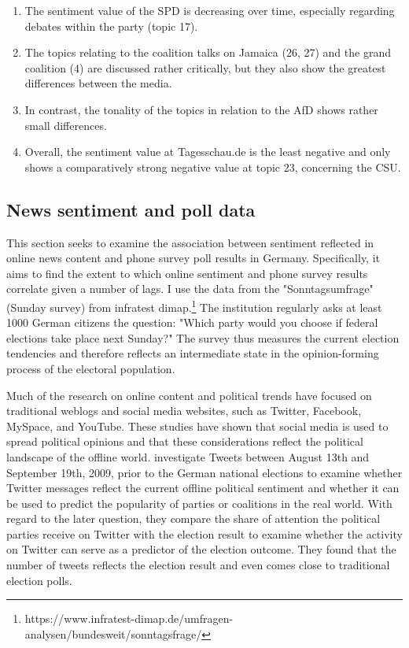\documentclass[12pt,a4paper,notitlepage]{article}
\begin{document}
\begin{enumerate}
	\item The sentiment value of the SPD is decreasing over time, especially regarding debates within the party (topic 17). 
	\item The topics relating to the coalition talks on Jamaica (26, 27) and the grand coalition (4) are discussed rather critically, but they also show the greatest differences between the media. 
	\item In contrast, the tonality of the topics in relation to the AfD shows rather small differences. 
	\item Overall, the sentiment value at Tagesschau.de is the least negative and only shows a comparatively strong negative value at topic 23, concerning the CSU.
\end{enumerate} 

\subsection{News sentiment and poll data}\label{ch_correlation}

This section seeks to examine the association between sentiment reflected in online news content and phone survey poll results in Germany. Specifically, it aims to find the extent to which online sentiment and phone survey results correlate given a number of lags. I use the data from the "Sonntagsumfrage" (Sunday survey) from infratest dimap.\footnote{https://www.infratest-dimap.de/umfragen-analysen/bundesweit/sonntagsfrage/} The institution regularly asks at least 1000 German citizens the question: "Which party would you choose if federal elections take place next Sunday?" The survey thus measures the current election tendencies and therefore reflects an intermediate state in the opinion-forming process of the electoral population.

Much of the research on online content and political trends have focused on traditional weblogs and social media websites, such as Twitter, Facebook, MySpace, and YouTube. These studies have shown that social media is used to spread political opinions and that these considerations reflect the political landscape of the offline world. \citet{tumasjan_predicting_2010} investigate Tweets between August 13th and September 19th, 2009, prior to the German national elections to examine whether Twitter messages reflect the current offline political sentiment and whether it can be used to predict the popularity of parties or coalitions in the real world. With regard to the later question, they compare the share of attention the political parties receive on Twitter with the election result to examine whether the activity on Twitter can serve as a predictor of the election outcome. They found that the number of tweets reflects the election result and even comes close to traditional election polls.
\end{document}

